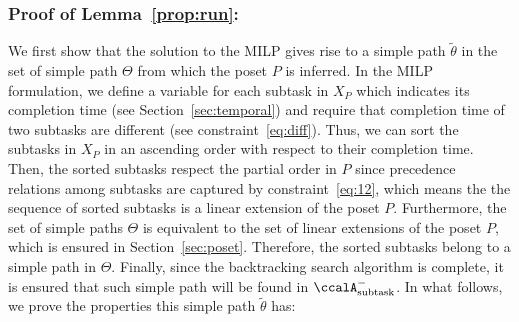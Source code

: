 \documentclass[Afour,sageh,times]{sagej}
\newcommand{\auto}[1]{\ccalA_{\textup{#1}}}
\begin{document}
{%

\subsubsection{Proof of Lemma~\ref{prop:run}:}\label{app:run}
We first show that the solution to the MILP gives rise to a simple path $\tilde{\theta}$ in the set of simple path $\Theta$ from which the poset $P$ is inferred. In the MILP formulation, we define a variable for each subtask in $X_P$ which indicates its completion time (see Section~\ref{sec:temporal}) and require that completion time of two subtasks are different (see constraint~\eqref{eq:diff}).  Thus, we can sort the subtasks in $X_P$  in an ascending order with respect to their completion time. Then, the sorted subtasks respect the partial order in $P$ since precedence relations among subtasks are captured by constraint~\eqref{eq:12}, which means the the sequence  of sorted subtasks is a linear extension of the poset $P$. Furthermore, the set of simple paths $\Theta$ is equivalent to the set of  linear extensions of the poset $P$, which is ensured in Section~\ref{sec:poset}. Therefore, the sorted subtasks belong to a simple path in $\Theta$. Finally, since the  backtracking search algorithm is complete, it is ensured that such simple path will be found in $\auto{subtask}^-$. In what follows, we prove the properties this simple path $\tilde{\theta}$ has:

}
\end{document}
